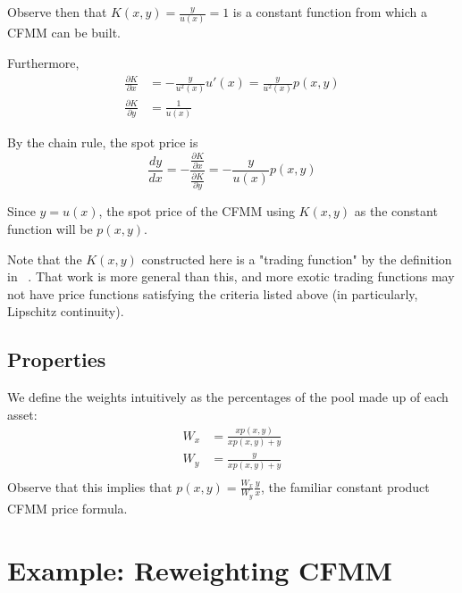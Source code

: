 \documentclass[11pt]{article} %
\begin{document}
Observe then that $K(x,y) = \frac{y}{u(x)} = 1$ is a constant function from which a CFMM can be built.

Furthermore,
\begin{align*}
\frac{\partial K}{\partial x} &= -\frac{y}{u^2(x)}u'(x) = \frac{y}{u^2(x)}p(x,y)\\
\frac{\partial K}{\partial y} &= \frac{1}{u(x)}
\end{align*}

By the chain rule, the spot price is
$$
\frac{dy}{dx} = -\frac{\frac{\partial K}{\partial x}}{\frac{\partial K}{\partial y}} = -\frac{y}{u(x)}p(x,y)
$$

Since $y=u(x)$, the spot price of the CFMM using $K(x,y)$ as the constant function will be $p(x,y)$.

Note that the $K(x,y)$ constructed here is a "trading function" by the definition in ~\cite{angeris2021replicating}.
That work is more general than this, and more exotic trading functions may not have price functions satisfying the criteria listed above (in particularly, Lipschitz continuity).







\subsection{Properties}

We define the weights intuitively as the percentages of the pool made up of each asset:
\begin{align*}
W_x &= \frac{xp(x,y)}{xp(x,y) + y}\\
W_y &= \frac{y}{xp(x,y) + y}\\
\end{align*}
Observe that this implies that $p(x,y) = \frac{W_x}{W_y}\frac{y}{x}$, the familiar constant product CFMM price formula.

\section{Example: Reweighting CFMM}
\end{document}
